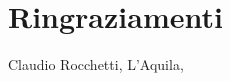 \thispagestyle{plain}			%
\section*{Ringraziamenti}

\vspace{1.5cm}
\hfill
Claudio Rocchetti, L'Aquila, %
